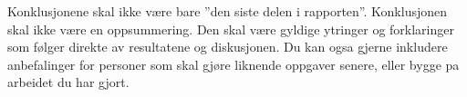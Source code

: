 Konklusjonene skal ikke være bare ”den siste delen i rapporten”. Konklusjonen skal ikke være en oppsummering. Den skal være gyldige ytringer og forklaringer som følger direkte av resultatene og diskusjonen. Du kan ogsa gjerne inkludere anbefalinger for personer som skal gjøre liknende oppgaver senere, eller bygge pa arbeidet du har gjort.
